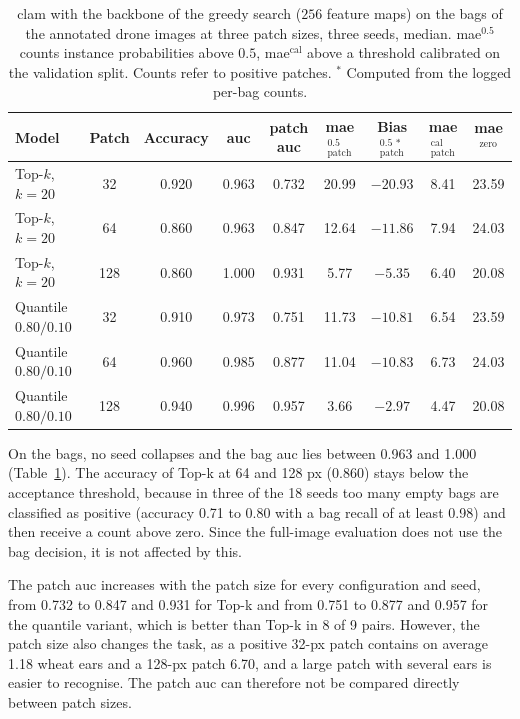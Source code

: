 \documentclass[12pt,parskip = half, DIV=classic,listof=totoc]{scrartcl}
\begin{document}
		\begin{table}[htbp]
			\centering
			\scriptsize
			\setlength{\tabcolsep}{4pt}
			\begin{tabular}{@{}lcccccccc@{}}
				\toprule
				Model & Patch & Accuracy & \acs*{auc} & patch \acs*{auc} & \acs*{mae}$_{\text{patch}}^{0.5}$ & Bias$_{\text{patch}}^{0.5\,\ast}$ & \acs*{mae}$_{\text{patch}}^{\text{cal}}$ & \acs*{mae}$^{\text{zero}}$ \\
				\midrule
				Top-$k$, $k=20$ & 32 & 0.920 & 0.963 & 0.732 & 20.99 & $-20.93$ & 8.41 & 23.59 \\
				Top-$k$, $k=20$ & 64 & 0.860 & 0.963 & 0.847 & 12.64 & $-11.86$ & 7.94 & 24.03 \\
				Top-$k$, $k=20$ & 128 & 0.860 & 1.000 & 0.931 & 5.77 & $-5.35$ & 6.40 & 20.08 \\
				\midrule
				Quantile $0.80/0.10$ & 32 & 0.910 & 0.973 & 0.751 & 11.73 & $-10.81$ & 6.54 & 23.59 \\
				Quantile $0.80/0.10$ & 64 & 0.960 & 0.985 & 0.877 & 11.04 & $-10.83$ & 6.73 & 24.03 \\
				Quantile $0.80/0.10$ & 128 & 0.940 & 0.996 & 0.957 & 3.66 & $-2.97$ & 4.47 & 20.08 \\
				\bottomrule
			\end{tabular}
			\caption[\acs*{clam} with the backbone of the greedy search ($256$ feature maps) on the bags of the annotated drone images at three patch sizes, three seeds, median]{\ac{clam} with the backbone of the greedy search ($256$ feature maps) on the bags of the annotated drone
			images at three patch sizes, three seeds, median. \acs*{mae}$^{0.5}$ counts instance probabilities above $0.5$,
			\acs*{mae}$^{\text{cal}}$ above a threshold calibrated on the validation split. Counts refer to
			positive patches. $^{\ast}$ Computed from the logged per-bag counts.}
			\label{tab:drone_annot_bags}
		\end{table}

		On the bags, no seed collapses and the bag \ac{auc} lies between 0.963 and 1.000 (Table~\ref{tab:drone_annot_bags}). 
		The accuracy of Top-k at 64 and 128 px (0.860) stays below the acceptance threshold, because 
		in three of the 18 seeds too many empty bags are classified as positive (accuracy 0.71 to 0.80 with a bag recall 
		of at least 0.98) and then receive a count above zero. Since the full-image evaluation does not use the bag decision, 
		it is not affected by this.

		The patch \ac{auc} increases with the patch size for every configuration and seed, from 0.732 to 0.847 and 
		0.931 for Top-k and from 0.751 to 0.877 and 0.957 for the quantile variant, which is better than Top-k 
		in 8 of 9 pairs. However, the patch size also changes the task, as a positive 32-px patch contains 
		on average 1.18 wheat ears and a 128-px patch 6.70, and a large patch with several ears is easier to recognise. 
		The patch \ac{auc} can therefore not be compared directly between patch sizes.
\end{document}
